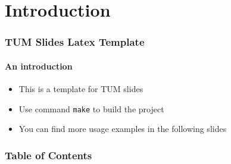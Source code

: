 \section{Introduction}
\begin{frame}
    \frametitle{TUM Slides Latex Template}
    \framesubtitle{An introduction}
    \begin{itemize}
        \item This is a template for TUM slides
        \item Use command \texttt{make} to build the project
        \item You can find more usage examples in the following slides
    \end{itemize}
\end{frame}

\begin{frame}
    \frametitle{Table of Contents}
    \tableofcontents
\end{frame}
